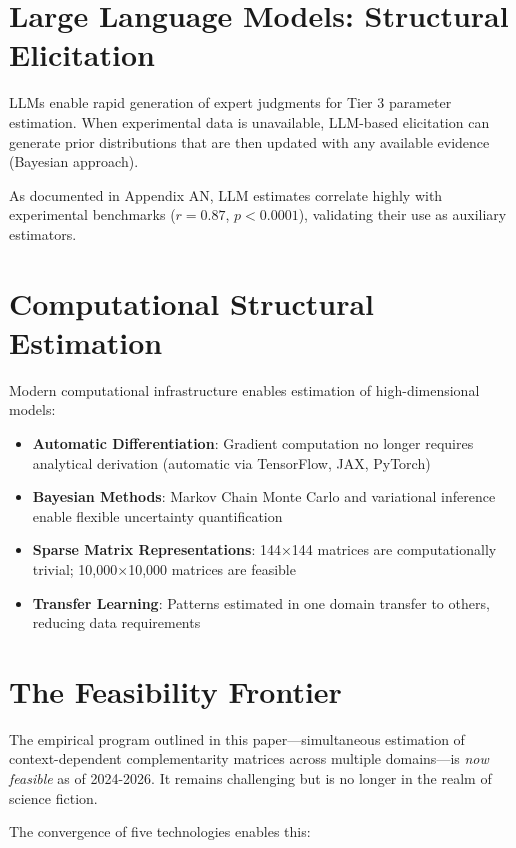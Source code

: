 \documentclass[12pt,oneside]{book}
\begin{document}
\section{Large Language Models: Structural Elicitation}

LLMs enable rapid generation of expert judgments for Tier 3 parameter estimation. When experimental
data is unavailable, LLM-based elicitation can generate prior distributions that are then updated
with any available evidence (Bayesian approach).

As documented in Appendix AN, LLM estimates correlate highly with experimental benchmarks
($r = 0.87$, $p < 0.0001$), validating their use as auxiliary estimators.

\section{Computational Structural Estimation}

Modern computational infrastructure enables estimation of high-dimensional models:

\begin{itemize}
  \item \textbf{Automatic Differentiation}: Gradient computation no longer requires analytical
        derivation (automatic via TensorFlow, JAX, PyTorch)
  \item \textbf{Bayesian Methods}: Markov Chain Monte Carlo and variational inference enable
        flexible uncertainty quantification
  \item \textbf{Sparse Matrix Representations}: 144×144 matrices are computationally trivial;
        10,000×10,000 matrices are feasible
  \item \textbf{Transfer Learning}: Patterns estimated in one domain transfer to others, reducing
        data requirements
\end{itemize}

\section{The Feasibility Frontier}

The empirical program outlined in this paper—simultaneous estimation of context-dependent
complementarity matrices across multiple domains—is \emph{now feasible} as of 2024-2026.
It remains challenging but is no longer in the realm of science fiction.

The convergence of five technologies enables this:
\end{document}
